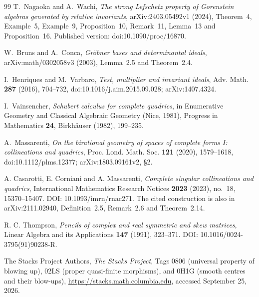 \documentclass[11pt,reqno]{amsart}
\numberwithin{equation}{section}
\theoremstyle{definition}\newtheorem{definition}[theorem]{Definition}
\theoremstyle{remark}\newtheorem{remark}[theorem]{Remark}
\begin{document}
\begin{thebibliography}{99}
T.~Nagaoka and A.~Wachi,
\emph{The strong Lefschetz property of Gorenstein algebras generated
by relative invariants}, arXiv:2403.05492v1 (2024),
Theorem~4, Example~5, Example~9, Proposition~10, Remark~11,
Lemma~13 and Proposition~16.
Published version: doi:10.1090/proc/16870.

W.~Bruns and A.~Conca,
\emph{Gr\"obner bases and determinantal ideals},
arXiv:math/0302058v3 (2003), Lemma~2.5 and Theorem~2.4.

I.~Henriques and M.~Varbaro,
\emph{Test, multiplier and invariant ideals},
Adv. Math. \textbf{287} (2016), 704--732,
doi:10.1016/j.aim.2015.09.028; arXiv:1407.4324.

I.~Vainsencher,
\emph{Schubert calculus for complete quadrics},
in Enumerative Geometry and Classical Algebraic Geometry (Nice, 1981),
Progress in Mathematics \textbf{24}, Birkh\"auser (1982), 199--235.

A.~Massarenti,
\emph{On the birational geometry of spaces of complete forms I:
collineations and quadrics},
Proc. Lond. Math. Soc. \textbf{121} (2020), 1579--1618,
doi:10.1112/plms.12377; arXiv:1803.09161v2, \S2.

A. Casarotti, E. Corniani and A. Massarenti,
\emph{Complete singular collineations and quadrics},
International Mathematics Research Notices \textbf{2023} (2023),
no.~18, 15370--15407. DOI: 10.1093/imrn/rnac271.
The cited construction is also in arXiv:2111.02940,
Definition~2.5, Remark~2.6 and Theorem~2.14.

R. C. Thompson, \emph{Pencils of complex and real symmetric and skew
matrices}, Linear Algebra and its Applications \textbf{147} (1991),
323--371. DOI: 10.1016/0024-3795(91)90238-R.


The Stacks Project Authors, \emph{The Stacks Project},
Tags 0806 (universal property of blowing up), 02LS (proper quasi-finite
morphisms), and 0H1G (smooth centres and their blow-ups),
\url{https://stacks.math.columbia.edu}, accessed September 25, 2026.


\end{thebibliography}
\end{document}
